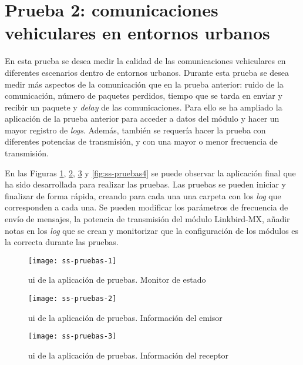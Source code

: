 \section{Prueba 2: comunicaciones vehiculares en entornos urbanos}
En esta prueba se desea medir la calidad de las comunicaciones vehiculares en
diferentes escenarios dentro de entornos urbanos. Durante esta prueba se desea
medir más aspectos de la comunicación que en la prueba anterior: ruido de la
comunicación, número de paquetes perdidos, tiempo que se tarda en enviar y
recibir un paquete y \emph{delay} de las comunicaciones. Para ello se ha
ampliado la aplicación de la prueba anterior para acceder a datos del módulo y
hacer un mayor registro de \emph{logs}. Además, también se requería hacer la
prueba con diferentes potencias de transmisión, y con una mayor o menor
frecuencia de transmisión.

En las Figuras \ref{fig:ss-pruebas1}, \ref{fig:ss-pruebas2}, \ref{fig:ss-pruebas3} y
\ref{fig:ss-pruebas4} se puede observar la aplicación final que ha sido
desarrollada para realizar las pruebas. Las pruebas se pueden iniciar y
finalizar de forma rápida, creando para cada una una carpeta con los \emph{log}
que corresponden a cada una. Se pueden modificar los parámetros de frecuencia
de envío de mensajes, la potencia de transmisión del módulo Linkbird-MX,
añadir notas en los \emph{log} que se crean y monitorizar que la configuración
de los módulos es la correcta durante las pruebas.

\begin{figure}[H]
	\begin{center}
		\texttt{[image: ss-pruebas-1]}
		\caption{\gls{ui} de la aplicación de pruebas. Monitor de estado}
		\label{fig:ss-pruebas1}
	\end{center}
\end{figure}

\begin{figure}[H]
	\begin{center}
		\texttt{[image: ss-pruebas-2]}
		\caption{\gls{ui} de la aplicación de pruebas. Información del emisor}
		\label{fig:ss-pruebas2}
	\end{center}
\end{figure}

\begin{figure}[H]
	\begin{center}
		\texttt{[image: ss-pruebas-3]}
		\caption{\gls{ui} de la aplicación de pruebas. Información del receptor}
		\label{fig:ss-pruebas3}
	\end{center}
\end{figure}

